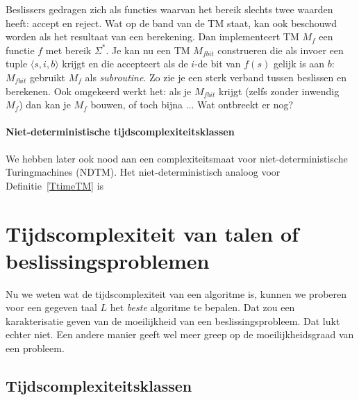 Beslissers gedragen zich als functies waarvan het bereik slechts twee
waarden heeft: accept en reject. Wat op de band van de TM staat, kan
ook beschouwd worden als het resultaat van een berekening. Dan
implementeert TM $M_f$ een functie $f$ met bereik $\Sigma^*$. Je kan
nu een TM $M_{fbit}$ construeren die als invoer een tuple $\langle s,i,b \rangle$ krijgt en
die accepteert als de $i$-de bit van $f(s)$ gelijk is aan $b$: $M_{fbit}$
gebruikt $M_f$ als {\em subroutine}. Zo zie je een sterk verband
tussen beslissen en berekenen. Ook omgekeerd werkt het: als je $M_{fbit}$
krijgt (zelfs zonder inwendig $M_f$) dan kan je $M_f$ bouwen, of toch
bijna ... Wat ontbreekt er nog?


\begin{sloppypar}
\paragraph{Niet-deterministische tijdscomplexiteitsklassen}
We hebben later ook nood aan een complexiteitsmaat voor
niet-deterministische Turingmachines (NDTM). Het niet-deterministisch
analoog voor Definitie~\ref{TtimeTM} is
\end{sloppypar}



\section{Tijdscomplexiteit van talen of beslissingsproblemen}


Nu we weten wat de tijdscomplexiteit van een algoritme is, kunnen we
proberen voor een gegeven taal $L$ het {\em beste} algoritme te
bepalen. Dat zou een karakterisatie geven van de moeilijkheid van een
beslissingsprobleem. Dat lukt echter niet. Een andere manier geeft wel
meer greep op de moeilijkheidsgraad van een probleem.

\subsection{Tijdscomplexiteitsklassen}





